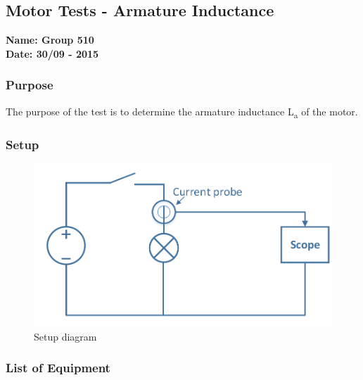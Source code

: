 \pagebreak
\subsection{Motor Tests - Armature Inductance} \label{app:motorTestArmatureInductance}
\textbf{Name: Group 510}\\
\textbf{Date: 30/09 - 2015}

\subsubsection{Purpose}
The purpose of the test is to determine the armature inductance \si{L_a} of the motor.

\subsubsection{Setup}
\begin{figure}[H]
  \centering
	\includegraphics[scale=0.5]{figures/MotorTest2.pdf}
	\caption{Setup diagram}
\end{figure}

\subsubsection{List of Equipment}

